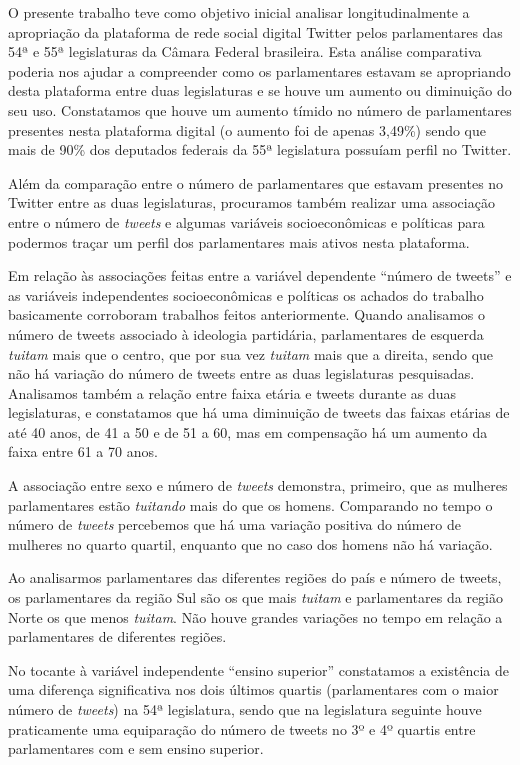 O presente trabalho teve como objetivo inicial analisar
longitudinalmente a apropriação da plataforma de rede social digital
Twitter pelos parlamentares das 54ª e 55ª legislaturas da Câmara Federal
brasileira. Esta análise comparativa poderia nos ajudar a compreender
como os parlamentares estavam se apropriando desta plataforma entre duas
legislaturas e se houve um aumento ou diminuição do seu uso. Constatamos
que houve um aumento tímido no número de parlamentares presentes nesta
plataforma digital (o aumento foi de apenas 3,49\%) sendo que mais de
90\% dos deputados federais da 55ª legislatura possuíam perfil no
Twitter.

Além da comparação entre o número de parlamentares que estavam presentes
no Twitter entre as duas legislaturas, procuramos também realizar uma
associação entre o número de \emph{tweets} e algumas variáveis
socioeconômicas e políticas para podermos traçar um perfil dos
parlamentares mais ativos nesta plataforma.

Em relação às associações feitas entre a variável dependente ``número de
tweets'' e as variáveis independentes socioeconômicas e políticas os
achados do trabalho basicamente corroboram trabalhos feitos
anteriormente. Quando analisamos o número de tweets associado à
ideologia partidária, parlamentares de esquerda \emph{tuitam} mais que o
centro, que por sua vez \emph{tuitam} mais que a direita, sendo que não
há variação do número de tweets entre as duas legislaturas pesquisadas.
Analisamos também a relação entre faixa etária e tweets durante as duas
legislaturas, e constatamos que há uma diminuição de tweets das faixas
etárias de até 40 anos, de 41 a 50 e de 51 a 60, mas em compensação há
um aumento da faixa entre 61 a 70 anos.

A associação entre sexo e número de \emph{tweets} demonstra, primeiro,
que as mulheres parlamentares estão \emph{tuitando} mais do que os
homens. Comparando no tempo o número de \emph{tweets} percebemos que há
uma variação positiva do número de mulheres no quarto quartil, enquanto
que no caso dos homens não há variação.

Ao analisarmos parlamentares das diferentes regiões do país e número de
tweets, os parlamentares da região Sul são os que mais \emph{tuitam} e
parlamentares da região Norte os que menos \emph{tuitam}. Não houve
grandes variações no tempo em relação a parlamentares de diferentes
regiões.

No tocante à variável independente ``ensino superior'' constatamos a
existência de uma diferença significativa nos dois últimos quartis
(parlamentares com o maior número de \emph{tweets}) na 54ª legislatura,
sendo que na legislatura seguinte houve praticamente uma equiparação do
número de tweets no 3º e 4º quartis entre parlamentares com e sem ensino
superior.

